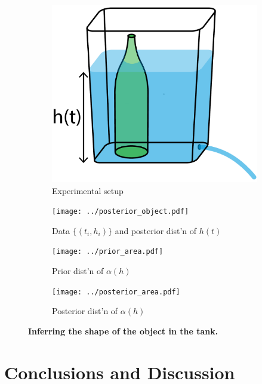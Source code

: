 \documentclass[openacc]{rsproca_new}%
\begin{document}
\begin{figure}[h!]
    \centering
        \begin{subfigure}[b]{0.3\textwidth}
    	\includegraphics[width=\textwidth]{../tank_geometry/tank_w_bottle.pdf}
	\caption{Experimental setup} \label{fig:tank_w_bottle}
    \end{subfigure}
     \begin{subfigure}[b]{0.49\textwidth}
    	\texttt{[image: ../posterior\_object.pdf]}
	\caption{Data $\{(t_i, h_i)\}$ and posterior dist'n of $h(t)$} \label{fig:posterior_object}
    \end{subfigure}
    
     \begin{subfigure}[b]{0.49\textwidth}
    	\texttt{[image: ../prior\_area.pdf]}
	\caption{Prior dist'n of $\alpha(h)$} \label{fig:prior_area.pdf}
    \end{subfigure}
       \begin{subfigure}[b]{0.49\textwidth}
    	\texttt{[image: ../posterior\_area.pdf]}
	\caption{Posterior dist'n of $\alpha(h)$} \label{fig:posterior_area.pdf}
    \end{subfigure}
    
  
    \caption{
      \textbf{Inferring the shape of the object in the tank.}
      }
\end{figure}

\section{Conclusions and Discussion}
\end{document}
